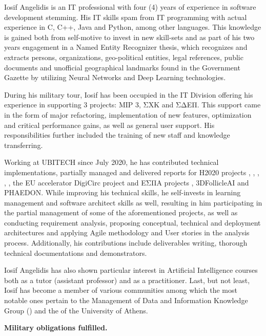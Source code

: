 \par{
Iosif Angelidis is an IT professional with four (4) years of experience in software development stemming. His IT skills spam from IT programming with actual experience in C, C++, Java and Python, among other languages. This knowledge is gained both from self-motive to invest in new skill-sets and as part of his two years engagement in a Named Entity Recognizer thesis, which recognizes and extracts persons, organizations, geo-political entities, legal references, public documents and unofficial geographical landmarks found in the Government Gazette by utilizing Neural Networks and Deep Learning technologies.}

\par{During his military tour, Iosif has been occupied in the IT Division offering his experience in supporting 3 projects: MIP 3, ΣΧΚ and ΣΔΕΠ. This support came in the form of major refactoring, implementation of new features, optimization and critical performance gains, as well as general user support. His responsibilities further included the training of new staff and knowledge transferring.}

\par{Working at UBITECH since July 2020, he has contributed technical implementations, partially managed and delivered reports for H2020 projects , , , , , the EU accelerator DigiCirc project  and ΕΣΠΑ projects , 3DFollicleAI and PHAEDON. While improving his technical skills, he self-invests in learning management and software architect skills as well, resulting in him participating in the partial management of some of the aforementioned projects, as well as conducting requirement analysis, proposing conceptual, technical and deployment architectures and applying Agile methodology and User stories in the analysis process. Additionally, his contributions include deliverables writing, thorough technical documentations and demonstrators.}

\par{Iosif Angelidis has also shown particular interest in Artificial Intelligence courses both as a tutor (assistant professor) and as a practitioner. Last, but not least, Iosif has become a member of various communities among which the most notable ones pertain to the Management of Data and Information Knowledge Group () and the  of the University of Athens. }

\par{\textbf{Military obligations fulfilled.} }
